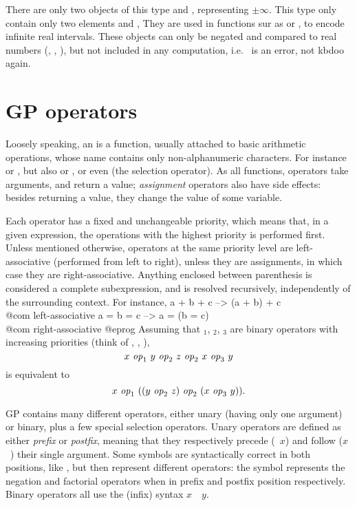 %

There are only two objects of this type  and , representing
$\pm\infty$. This type only contain only two elements  and ,
They are used in functions sur as  or , to
encode infinite real intervals. These objects can only be negated and
compared to real numbers (, , ), but not
included in any computation, i.e.~ is an error, not kbd{oo} again.

\section{GP operators}\label{se:operators}

\noindent Loosely speaking, an  is a function, usually
attached to basic arithmetic operations, whose name contains only
non-alphanumeric characters. For instance \kbd{+} or \kbd{-}, but also
\kbd{=} or \kbd{+=}, or even \kbd{[ ]} (the selection operator). As all
functions, operators take arguments, and return a value; \emph{assignment}
operators also have side effects: besides returning a value, they change the
value of some variable.

Each operator has a fixed and unchangeable priority, which means that, in
a given expression, the operations with the highest priority is performed
first. Unless mentioned otherwise, operators at the same priority level are
left-associative (performed from left to right), unless they are assignments,
in which case they are right-associative. Anything enclosed between
parenthesis is considered a complete subexpression, and is resolved
recursively, independently of the surrounding context. For instance,
\bprog
  a + b + c    -->   (a + b) + c     \\@com left-associative
  a = b = c    -->   a = (b = c)     \\@com right-associative
@eprog\noindent
Assuming that $_1$, $_2$, $_3$ are
binary operators with increasing priorities (think of \kbd{+},
\kbd{*}, \kbd{\pow}),
$$ x~\hbox{\it op\/}_1~y~\hbox{\it op\/}_2~z~\hbox{\it op\/}_2~x~\hbox{\it op\/}_3~y $$ is
equivalent to $$ x~\hbox{\it op\/}_1~((y~\hbox{\it op\/}_2~z)~\hbox{\it op\/}_2~
(x~\hbox{\it op\/}_3~y)).$$

GP contains many different operators, either unary (having only
one argument) or binary, plus a few special selection operators. Unary
operators are defined as either \emph{prefix}  or \emph{postfix}, meaning
that they respectively precede (~$x$) and follow ($x$~) their
single argument. Some symbols are syntactically correct in both positions,
like \kbd{!}, but then represent different operators: the \kbd{!} symbol
represents the negation and factorial operators when in prefix and postfix
position respectively. Binary operators all use the (infix) syntax
$x$~~$y$.

